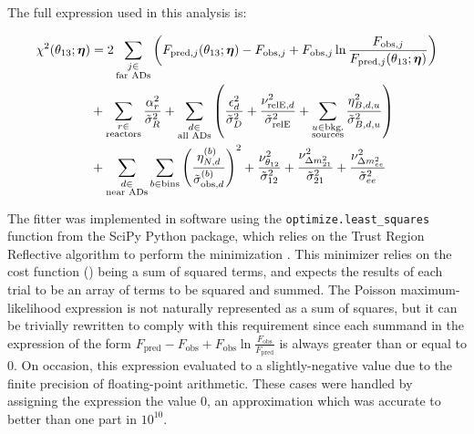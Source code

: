The full \chisquare{} expression used in this analysis is:

\begin{align}\label{eq:chisquare_full}
    \begin{split}
        \chi^2(\theta_{13};\boldsymbol{\eta}) &=
            2\sum_{\substack{j \in \\\text{far ADs}}}
        \left(
            F_{\text{pred},j}(\theta_{13};\boldsymbol{\eta}) - F_{\text{obs},j}
            + F_{\text{obs},j}\ln
            \frac{F_{\text{obs},j}}{F_{\text{pred},j}(\theta_{13};\boldsymbol{\eta})}
        \right) \\
            &+ \sum_{\substack{r \in \\\text{reactors}}}
                \frac{\alpha_r^2}{\tilde{\sigma}_R^2}
            + \sum_{\substack{d \in \\\text{all ADs}}}
            \left(
                \frac{\epsilon_d^2}{\tilde{\sigma}_D^2}
                + \frac{\nu_{\text{relE},d}^2}{\tilde{\sigma}_{\text{relE}}^2}
                + \sum_{\substack{u \in \text{bkg.}\\\text{sources}}}
                \frac{\eta_{B,d,u}^2}{\tilde{\sigma}_{B,d,u}^2}
            \right) \\
            &+ \sum_{\substack{d \in \\\text{near ADs}}}
            \sum_{b \in \text{bins}}
            \left(\frac{\eta_{N,d}^{(b)}}{\tilde{\sigma}_{\text{obs},d}^{(b)}}
            \right)^2
            + \frac{\nu_{\theta_{12}}^2}{\tilde{\sigma}_{12}^2}
            + \frac{\nu_{\Delta m^2_{21}}^2}{\tilde{\sigma}_{21}^2}
            + \frac{\nu_{\Delta m^2_{ee}}^2}{\tilde{\sigma}_{ee}^2}
    \end{split}
\end{align}

The fitter was implemented in software using the
\texttt{optimize.least\_squares} function from the SciPy Python package,
which relies on the Trust Region Reflective algorithm
to perform the \chisquare{} minimization \cite{scipy,trf_minimizer}.
This minimizer relies on the cost function (\chisquare{})
being a sum of squared terms,
and expects the results of each trial
to be an array of terms to be squared and summed.
The Poisson maximum-likelihood \chisquare{} expression
is not naturally represented as a sum of squares,
but it can be trivially rewritten to comply with this requirement
since each summand in the \chisquare{} expression of the form
$F_\text{pred}-F_\text{obs}+F_\text{obs}\ln\frac{F_\text{obs}}{F_\text{pred}}$
is always greater than or equal to 0.
On occasion, this expression evaluated to a slightly-negative value
due to the finite precision of floating-point arithmetic.
These cases were handled by assigning the expression the value 0,
an approximation which was accurate to better than one part in $10^{10}$.

